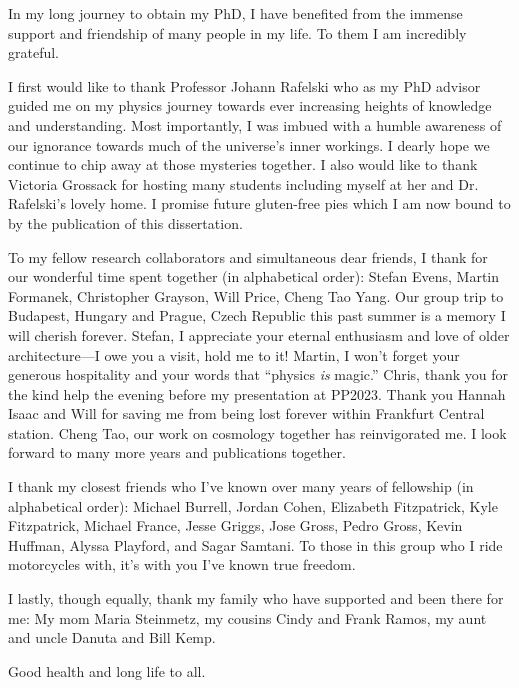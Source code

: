
In my long journey to obtain my PhD, I have benefited from the immense support and friendship of many people in my life. To them I am incredibly grateful.

I first would like to thank Professor Johann Rafelski who as my PhD advisor guided me on my physics journey towards ever increasing heights of knowledge and understanding. Most importantly, I was imbued with a humble awareness of our ignorance towards much of the universe's inner workings. I dearly hope we continue to chip away at those mysteries together. I also would like to thank Victoria Grossack for hosting many students including myself at her and Dr. Rafelski's lovely home. I promise future gluten-free pies which I am now bound to by the publication of this dissertation.

To my fellow research collaborators and simultaneous dear friends, I thank for our wonderful time spent together (in alphabetical order): Stefan Evens, Martin Formanek, Christopher Grayson, Will Price, Cheng Tao Yang. Our group trip to Budapest, Hungary and Prague, Czech Republic this past summer is a memory I will cherish forever. Stefan, I appreciate your eternal enthusiasm and love of older architecture---I owe you a visit, hold me to it! Martin, I won't forget your generous hospitality and your words that ``physics \emph{is} magic.'' Chris, thank you for the kind help the evening before my presentation at PP2023. Thank you Hannah Isaac and Will for saving me from being lost forever within Frankfurt Central station. Cheng Tao, our work on cosmology together has reinvigorated me. I look forward to many more years and publications together.

I thank my closest friends who I've known over many years of fellowship (in alphabetical order): Michael Burrell, Jordan Cohen, Elizabeth Fitzpatrick, Kyle Fitzpatrick, Michael France, Jesse Griggs, Jose Gross, Pedro Gross, Kevin Huffman, Alyssa Playford, and Sagar Samtani. To those in this group who I ride motorcycles with, it's with you I've known true freedom.

I lastly, though equally, thank my family who have supported and been there for me: My mom Maria Steinmetz, my cousins Cindy and Frank Ramos, my aunt and uncle Danuta and Bill Kemp.

Good health and long life to all.